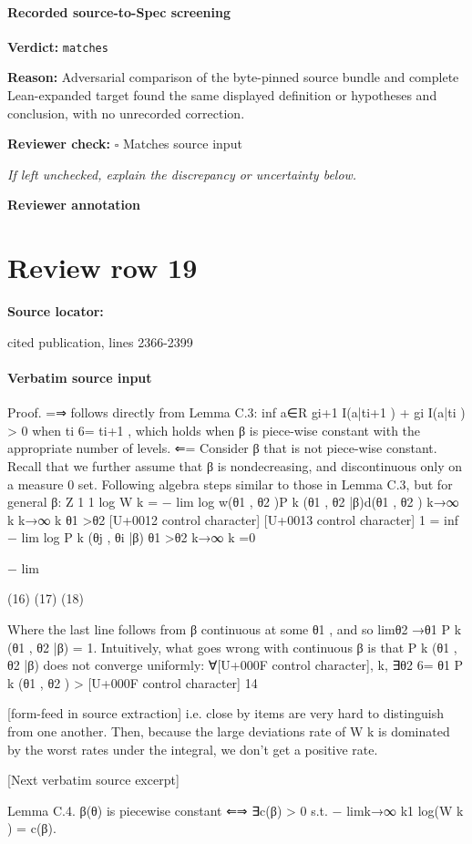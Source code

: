 \documentclass[10pt]{article}
\newcommand{\reviewerbox}{%
  \par\noindent\fbox{\parbox{0.96\linewidth}{\rule{0pt}{0.38in}}}\par
}
\newcommand{\reviewmatch}[1]{%
  \par\noindent\textbf{Reviewer check:} $\square$\; #1\par
  \noindent\emph{If left unchecked, explain the discrepancy or uncertainty below.}\par
}
\begin{document}
\paragraph{Recorded source-to-Spec screening}
\textbf{Verdict:} \texttt{matches}
\\
{\raggedright
\textbf{Reason:} Adversarial comparison of the byte-\allowbreak{}pinned source bundle and complete Lean-\allowbreak{}expanded target found the same displayed definition or hypotheses and conclusion, with no unrecorded correction.\allowbreak{}
\par}
\reviewmatch{Matches source input}
\noindent\textbf{Reviewer annotation}\par
\reviewerbox
\clearpage
\hypertarget{source-claim-043c064a62132f60}{}
\section*{Review row 19}
\textbf{Source locator:} {\footnotesize\raggedright cited publication, lines 2366-\allowbreak{}2399\par}
\paragraph{Verbatim source input}
\begin{ReviewVerbatim}
Proof. =⇒ follows directly from Lemma C.3: inf a∈R {gi+1 I(a|ti+1 ) + gi I(a|ti )} > 0 when ti 6= ti+1 ,
which holds when β is piece-wise constant with the appropriate number of levels.
⇐= Consider β that is not piece-wise constant. Recall that we further assume that β is nondecreasing, and discontinuous only on a measure 0 set. Following algebra steps similar to those in
Lemma C.3, but for general β:
Z
1
1
log W k = − lim log
w(θ1 , θ2 )P k (θ1 , θ2 |β)d(θ1 , θ2 )
k→∞ k
k→∞ k
θ1 >θ2
[U+0012 control character]
[U+0013 control character]
1
= inf − lim log P k (θj , θi |β)
θ1 >θ2
k→∞ k
=0

− lim

(16)
(17)
(18)

Where the last line follows from β continuous at some θ1 , and so limθ2 →θ1 P k (θ1 , θ2 |β) = 1.
Intuitively, what goes wrong with continuous β is that P k (θ1 , θ2 |β) does not converge uniformly:
∀[U+000F control character], k, ∃θ2 6= θ1 P k (θ1 , θ2 ) > [U+000F control character]
14


[form-feed in source extraction]
i.e. close by items are very hard to distinguish from one another. Then, because the large deviations
rate of W k is dominated by the worst rates under the integral, we don’t get a positive rate.


[Next verbatim source excerpt]

Lemma C.4. β(θ) is piecewise constant ⇐⇒ ∃c(β) > 0 s.t. − limk→∞ k1 log(W k ) = c(β).
\end{ReviewVerbatim}
\end{document}
